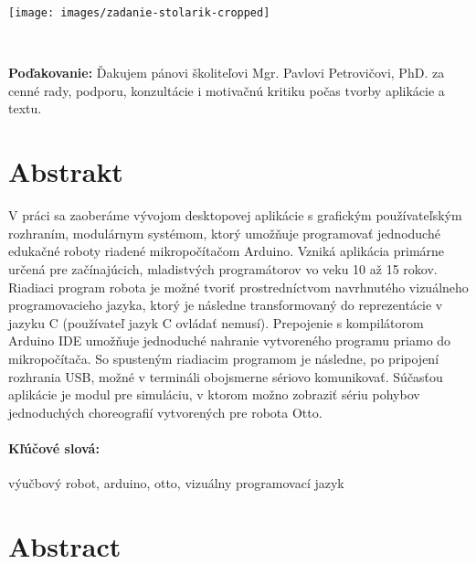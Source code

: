 \documentclass[12pt, twoside]{book}
\begin{document}
\newpage 
\thispagestyle{empty}
\hspace{-2cm}\texttt{[image: images/zadanie-stolarik-cropped]}


\frontmatter

\setcounter{page}{7}
\newpage 
~

\vfill
{\bf Poďakovanie:} Ďakujem pánovi školiteľovi Mgr. Pavlovi Petrovičovi, PhD. za cenné rady, podporu, konzultácie i motivačnú kritiku počas tvorby aplikácie a textu.


\newpage 
\section*{Abstrakt}
V práci sa zaoberáme vývojom desktopovej aplikácie s grafickým používateľským rozhraním, modulárnym systémom, ktorý umožňuje programovať jednoduché edukačné roboty riadené mikropočítačom Arduino. Vzniká aplikácia primárne určená pre začínajúcich, mladistvých programátorov vo veku 10 až 15 rokov. Riadiaci program robota je možné tvoriť prostredníctvom navrhnutého vizuálneho programovacieho jazyka, ktorý je následne transformovaný do reprezentácie v jazyku C (používateľ jazyk C ovládať nemusí). Prepojenie s kompilátorom Arduino IDE umožňuje jednoduché nahranie vytvoreného programu priamo do mikropočítača. So spusteným riadiacim programom je následne, po pripojení rozhrania USB, možné v termináli obojsmerne sériovo komunikovať. Súčasťou aplikácie je modul pre simuláciu, v ktorom možno zobraziť sériu pohybov jednoduchých choreografií vytvorených pre robota Otto.

\paragraph*{Kľúčové slová:} výučbový robot, arduino, otto, vizuálny programovací jazyk


\newpage 
\section*{Abstract}
\end{document}
